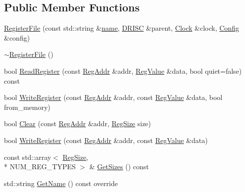 \subsection*{Public Member Functions}
\begin{DoxyCompactItemize}
\item 
\hyperlink{class_simulator_1_1drisc_1_1_register_file_a902eaa0956b6665c1fa87f11b2690063}{Register\+File} (const std\+::string \&\hyperlink{mtconf_8c_a8f8f80d37794cde9472343e4487ba3eb}{name}, \hyperlink{class_simulator_1_1_d_r_i_s_c}{D\+R\+I\+S\+C} \&parent, \hyperlink{class_simulator_1_1_clock}{Clock} \&clock, \hyperlink{class_config}{Config} \&config)
\item 
\hyperlink{class_simulator_1_1drisc_1_1_register_file_a1e5f8e22e1ca12407a88affcef842f9e}{$\sim$\+Register\+File} ()
\item 
bool \hyperlink{class_simulator_1_1drisc_1_1_register_file_a7d0be640b64e928e9d718795b728fb52}{Read\+Register} (const \hyperlink{struct_simulator_1_1_reg_addr}{Reg\+Addr} \&addr, \hyperlink{struct_simulator_1_1_reg_value}{Reg\+Value} \&data, bool quiet=false) const 
\item 
bool \hyperlink{class_simulator_1_1drisc_1_1_register_file_abc1cac113329975529f46b8553700055}{Write\+Register} (const \hyperlink{struct_simulator_1_1_reg_addr}{Reg\+Addr} \&addr, const \hyperlink{struct_simulator_1_1_reg_value}{Reg\+Value} \&data, bool from\+\_\+memory)
\item 
bool \hyperlink{class_simulator_1_1drisc_1_1_register_file_a668eef9557b1f1b1f2fc681fd9507366}{Clear} (const \hyperlink{struct_simulator_1_1_reg_addr}{Reg\+Addr} \&addr, \hyperlink{namespace_simulator_a7c5ca3b196c951c92b8159e54e76075f}{Reg\+Size} size)
\item 
bool \hyperlink{class_simulator_1_1drisc_1_1_register_file_aaf83ea9d0765ff83881ffb8e97bf4ac8}{Write\+Register} (const \hyperlink{struct_simulator_1_1_reg_addr}{Reg\+Addr} \&addr, const \hyperlink{struct_simulator_1_1_reg_value}{Reg\+Value} \&data)
\item 
const std\+::array$<$ \hyperlink{namespace_simulator_a7c5ca3b196c951c92b8159e54e76075f}{Reg\+Size}, \\*
N\+U\+M\+\_\+\+R\+E\+G\+\_\+\+T\+Y\+P\+E\+S $>$ \& \hyperlink{class_simulator_1_1drisc_1_1_register_file_a71861b5faaf03e6ecceaeb9bfcaae10b}{Get\+Sizes} () const 
\item 
std\+::string \hyperlink{class_simulator_1_1drisc_1_1_register_file_a3588d3d9aaa9b01b5ff0eb85ab140c42}{Get\+Name} () const override
\item 

\end{DoxyCompactItemize}
